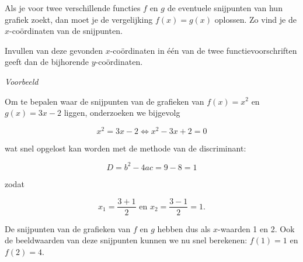 \noindent Als je voor twee verschillende functies $f$ en $g$ de
eventuele snijpunten van hun grafiek zoekt, dan moet je de vergelijking
$f(x)=g(x)$ oplossen. Zo vind je de $x$-co\"ordinaten van de snijpunten.


Invullen van deze gevonden $x$-co\"ordinaten in één van de twee functievoorschriften
geeft dan de bijhorende $y$-co\"ordinaten.

\medskip{}
\emph{Voorbeeld}

Om te bepalen waar de snijpunten van de grafieken van $f(x)=x^2$ en $g(x)=3x-2$ liggen, onderzoeken we bijgevolg

\begin{equation*}
x^2 = 3x-2 \iff x^2-3x+2=0
\end{equation*}

wat snel opgelost kan worden met de methode van de discriminant:

\begin{equation*}
D = b^2 - 4ac = 9-8=1
\end{equation*}

zodat

\begin{equation*}
x_1 = \frac{3+1}{2} \text{ en } x_2 = \frac{3-1}{2} = 1.
\end{equation*}


De snijpunten van de grafieken van $f$ en $g$ hebben dus als $x$-waarden 1 en 2. Ook de beeldwaarden van deze snijpunten kunnen we nu snel berekenen: $f(1)=1$ en $f(2)=4$.

%
%
%


